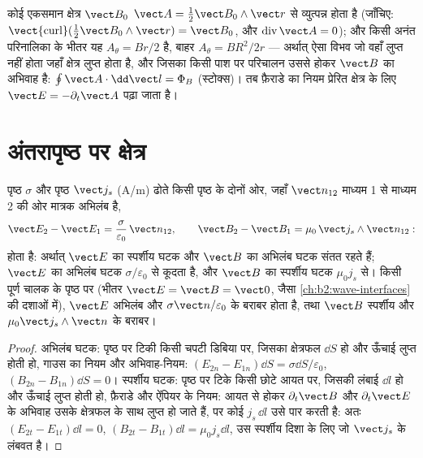 \begin{example}[दो सदिश विभव]\label{ex:b2:maxwell-equations:vectorpot}
कोई एकसमान क्षेत्र $\vect B_0$ $\vect A = \tfrac12\vect B_0\wedge\vect r$ से व्युत्पन्न होता है
(जाँचिए: $\operatorname{\vect{curl}}(\tfrac12\vect B_0\wedge\vect r) = \vect B_0$, और
$\operatorname{div}\vect A = 0$); और किसी अनंत परिनालिका के भीतर यह $A_\theta =
Br/2$ है, बाहर $A_\theta = BR^2/2r$ --- अर्थात् ऐसा विभव जो वहाँ लुप्त नहीं होता
जहाँ क्षेत्र लुप्त होता है, और जिसका किसी पाश पर परिचालन उससे होकर
$\vect B$ का अभिवाह है: $\oint\vect A\cdot\dd\vect l = \Phi_B$ (स्टोक्स)। तब फ़ैराडे का
नियम प्रेरित क्षेत्र के लिए $\vect E = -\partial_t\vect A$ पढ़ा जाता है।
\end{example}

\section{अंतरापृष्ठ पर क्षेत्र}

\begin{proposition}[सीमा-संबंध]\label{prop:b2:maxwell-equations:boundary}
पृष्ठ  $\sigma$ और पृष्ठ  $\vect j_s$ (\unit{A/m}) ढोते
किसी पृष्ठ के दोनों ओर, जहाँ $\vect n_{12}$ माध्यम 1 से माध्यम 2 की ओर मात्रक
अभिलंब है,
\[
\vect E_2 - \vect E_1 = \frac\sigma{\varepsilon_0}\,\vect n_{12} , \qquad
\vect B_2 - \vect B_1 = \mu_0\,\vect j_s\wedge\vect n_{12} :
\]
होता है: अर्थात् $\vect E$ का स्पर्शीय घटक और $\vect B$ का अभिलंब घटक
संतत रहते हैं; $\vect E$ का अभिलंब घटक $\sigma/\varepsilon_0$ से कूदता है,
और $\vect B$ का स्पर्शीय घटक $\mu_0j_s$ से। किसी पूर्ण चालक के पृष्ठ पर
(भीतर $\vect E = \vect B = \vect 0$, जैसा \cref{ch:b2:wave-interfaces} की
दशाओं में), $\vect E$ अभिलंब और $\sigma\vect n/
\varepsilon_0$ के बराबर होता है,
तथा $\vect B$ स्पर्शीय और $\mu_0\vect j_s\wedge\vect n$ के बराबर।
\end{proposition}

\begin{proof}
अभिलंब घटक: पृष्ठ पर टिकी किसी चपटी डिबिया पर, जिसका क्षेत्रफल $\dd S$ हो
और ऊँचाई लुप्त होती हो, गाउस का नियम और अभिवाह-नियम: $(E_{2n}
- E_{1n})\dd S = \sigma\dd S/\varepsilon_0$, $(B_{2n} - B_{1n})\dd S = 0$। स्पर्शीय
घटक: पृष्ठ पर टिके किसी छोटे आयत पर, जिसकी लंबाई $\dd l$ हो और ऊँचाई
लुप्त होती हो, फ़ैराडे और ऐंपियर के नियम: आयत से होकर
$\partial_t\vect B$ और $\partial_t\vect E$ के अभिवाह उसके क्षेत्रफल के साथ लुप्त हो
जाते हैं, पर कोई  $j_s\,\dd l$ उसे पार करती है:
अतः $(E_{2t} - E_{1t})\dd l = 0$, $(B_{2t} - B_{1t})\dd l = \mu_0j_s\dd l$, उस
स्पर्शीय दिशा के लिए जो $\vect j_s$ के लंबवत है।
\end{proof}

